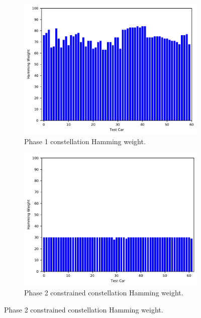 \documentclass[aps,pra,twocolumn,superscriptaddress,groupedaddress]{revtex4}  %
\begin{document}
\begin{figure}
  \centering
  \begin{subfigure}[b]{.475\textwidth}
    \centering
    \includegraphics[width=\textwidth]{figures/phase2/2-prod-hamming.pdf}  
    \caption{Phase 1 constellation Hamming weight.}
    \label{fig:sub-first}
  \end{subfigure}
  \hfill
  \begin{subfigure}[b]{.475\textwidth}
    \centering
    \includegraphics[width=\textwidth]{figures/phase2/2p-prod-hamming.pdf}  
    \caption{Phase 2 constrained constellation Hamming weight.}
    \label{fig:sub-second}
  \end{subfigure}

\end{figure}
\end{document}
